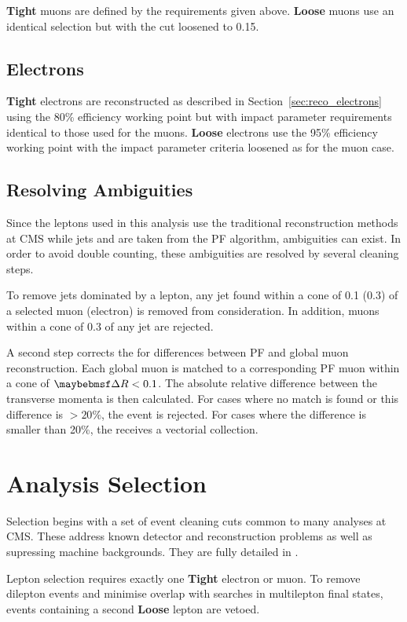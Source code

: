 \textbf{Tight} muons are defined by the requirements given above. \textbf{Loose}
muons use an identical selection but with the \CombIso cut loosened to 0.15.

\subsection{Electrons}
\textbf{Tight} electrons are reconstructed as described in
Section~\ref{sec:reco_electrons} using the 80\% efficiency working point but
with impact parameter requirements identical to those used for the
muons. \textbf{Loose} electrons use the 95\% efficiency working point with the
impact parameter criteria loosened as for the muon case.

\subsection{Resolving Ambiguities}
Since the leptons used in this analysis use the traditional reconstruction
methods at \ac{CMS} while jets and \MET are taken from the \ac{PF} algorithm,
ambiguities can exist. In order to avoid double counting, these ambiguities are
resolved by several cleaning steps.

To remove jets dominated by a lepton, any jet found within a cone of 0.1 (0.3)
of a selected muon (electron) is removed from consideration. In addition, muons
within a cone of 0.3 of any jet are rejected.

A second step corrects the \MET for differences between \ac{PF} and global muon
reconstruction. Each global muon is matched to a corresponding \ac{PF} muon
within a cone of $\DeltaR < 0.1$. The absolute relative difference between the
transverse momenta is then calculated. For cases where no match is found or this
difference is $> 20\%$, the event is rejected. For cases where the difference is
smaller than 20\%, the \MET receives a vectorial collection.

\section{Analysis Selection}
Selection begins with a set of event cleaning cuts common to many analyses at
\ac{CMS}. These address known detector and reconstruction problems as well as
supressing machine backgrounds. They are fully detailed in
\cite{susy_selection_an}.

Lepton selection requires exactly one \textbf{Tight} electron or muon. To remove
dilepton events and minimise overlap with searches in multilepton final states,
events containing a second \textbf{Loose} lepton are vetoed.

